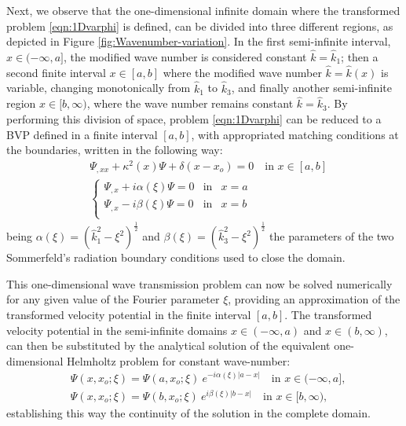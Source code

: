 Next, we observe that the one-dimensional infinite domain where the transformed problem \eqref{eqn:1Dvarphi} is defined, can be divided into three different regions, as depicted in Figure \ref{fig:Wavenumber-variation}. In the first semi-infinite interval, $x \in (-\infty,a]$, the modified wave number is considered constant $\hat k = \hat k_1$; then a second finite interval $x\in[a,b]$ where the modified wave number $\hat k=\hat k(x)$ is variable, changing monotonically from $\hat k_1$ to $\hat k_3$, and finally another semi-infinite region $x \in [b,\infty)$, where the wave number remains constant $\hat k=\hat k_3$. By performing this division of space, problem \eqref{eqn:1Dvarphi} can be reduced to a BVP defined in a finite interval $[a,b]$, with appropriated matching conditions at the boundaries, written in the following way:
%
\begin{align}
\label{eqn:1Dvarphi in 2}
& \varPsi_{,xx} + \kappa^{2}(x) \varPsi + \delta(x - x_o) = 0 \quad \text{in } x \in [a,b] \\
\label{eqn:bc-varphi-x}
& \left\{\begin{array}{lll}
\varPsi_{,x} + i \alpha(\xi) \varPsi  =  0 & \text{in} & x=a \\
\varPsi_{,x} - i \beta(\xi) \varPsi  =  0 & \text{in} & x=b \\
\end{array}\right.
\end{align}
%
being $\alpha(\xi)=(\hat{k}_1^2-\xi^2)^\frac{1}{2}$ and $\beta(\xi)=(\hat{k}_3^2-\xi^2)^\frac{1}{2}$ the parameters of the two Sommerfeld's radiation boundary conditions used to close the domain.

This one-dimensional wave transmission problem can now be solved numerically for any given value of the Fourier parameter $\xi$, providing an approximation of the transformed velocity potential in the finite interval $[a,b]$. The transformed velocity potential in the semi-infinite domains $x \in (-\infty, a)$ and $x \in (b,\infty)$, can then be substituted by the analytical solution of the equivalent one-dimensional Helmholtz problem for constant wave-number:
%
\begin{align}
& \varPsi(x,x_o;\xi)=\varPsi(a,x_o;\xi) \: e^{-i \alpha(\xi) \vert a-x \vert} \quad \text{in } x \in (-\infty,a], \\
& \varPsi(x,x_o;\xi)=\varPsi(b,x_o;\xi) \: e^{i \beta(\xi) \vert b-x \vert} \quad \text{in } x \in [b,\infty),
\end{align}
%
establishing this way the continuity of the solution in the complete domain.

